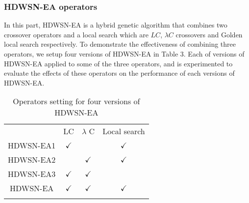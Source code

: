 \documentclass[final]{elsarticle}
\begin{document}
\subsubsection{HDWSN-EA operators}
In this part, HDWSN-EA is a hybrid genetic algorithm that combines two crossover operators and a local search which are $ LC $, $ \lambda C $ crossovers and Golden local search respectively. To demonstrate the effectiveness of combining three operators, we setup four versions of HDWSN-EA in Table 3. Each of versions of HDWSN-EA applied to some of the three operators, and is experimented to evaluate the effects of these operators on the performance of each versions of HDWSN-EA.\\
\begin{table}
	\caption{Operators setting for four versions of HDWSN-EA}
	\label{tab3}       %
	\begin{center}
		\renewcommand{\arraystretch}{1.0}
		\resizebox{0.75\textwidth}{!} {
			\begin{tabular}{cccc}
				\hline\noalign{\smallskip}
				&	LC 	&	$\lambda$ C 	&	Local search	\\
				\noalign{\smallskip}\hline\noalign{\smallskip}
				HDWSN-EA1	&$\checkmark$	&		&$\checkmark$		\\
				HDWSN-EA2	&		&	$\checkmark$	& $\checkmark$		\\
				HDWSN-EA3	&	$\checkmark$		&		$\checkmark$	&	\\
				HDWSN-EA	&	$\checkmark$	&	$\checkmark$	&	$\checkmark$	\\
				\noalign{\smallskip} \hline
		\end{tabular}}
	\end{center}
\end{table}
\end{document}
